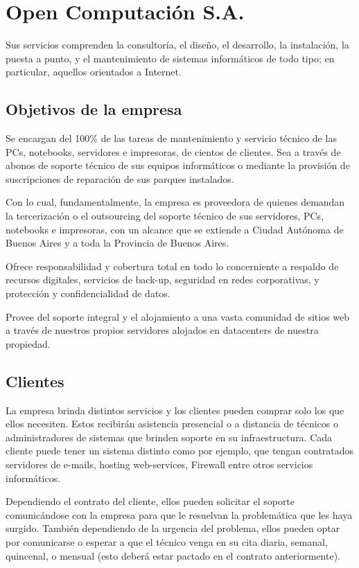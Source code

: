 \documentclass[12pt,a4paper]{article}
\begin{document}
\section{Open Computación S.A.}
Sus servicios comprenden la consultoría, el diseño, el desarrollo, la instalación, la puesta a punto, y el mantenimiento de sistemas informáticos de todo tipo; en particular, aquellos orientados a Internet.

\subsection{Objetivos de la empresa}
Se encargan del 100\% de las tareas de mantenimiento y servicio técnico de las PCs, notebooks, servidores e impresoras, de cientos de clientes. Sea a través de abonos de soporte técnico de sus equipos informáticos o mediante la provisión de suscripciones de reparación de sus parques instalados.

Con lo cual, fundamentalmente, la empresa es proveedora de quienes demandan la tercerización o el outsourcing del soporte técnico de sus servidores, PCs, notebooks e impresoras, con un alcance que se extiende a Ciudad Autónoma de Buenos Aires y a toda la Provincia de Buenos Aires.

Ofrece responsabilidad y cobertura total en todo lo concerniente a respaldo de recursos digitales, servicios de back-up, seguridad en redes corporativas, y protección y confidencialidad de datos.

Provee del soporte integral y el alojamiento a una vasta comunidad de sitios web a través de nuestros propios servidores alojados en datacenters de nuestra propiedad.

\subsection{Clientes}
La empresa brinda distintos servicios y los clientes pueden comprar solo los que ellos necesiten. Estos recibirán asistencia presencial o a distancia de técnicos o administradores de sistemas que brinden soporte en su infraestructura. Cada cliente puede tener un sistema distinto como por ejemplo, que tengan contratados servidores de e-mails, hosting web-services, Firewall entre otros servicios informáticos.

Dependiendo el contrato del cliente, ellos pueden solicitar el soporte comunicándose con la empresa para que le resuelvan la problemática que les haya surgido. También dependiendo de la urgencia del problema, ellos pueden optar por comunicarse o esperar a que el técnico venga en su cita diaria, semanal, quincenal, o mensual (esto deberá estar pactado en el contrato anteriormente).
\end{document}
